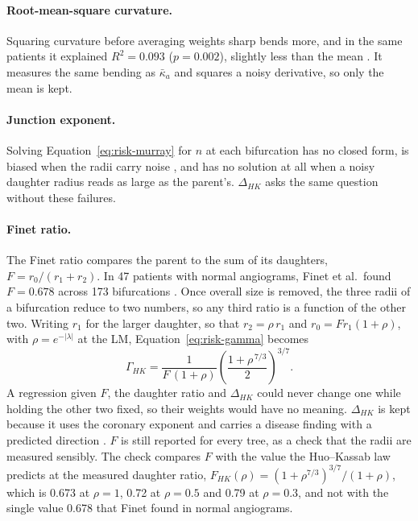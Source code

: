 \paragraph{Root-mean-square curvature.}
Squaring curvature before averaging weights sharp bends more, and in the same patients it explained $R^2 = 0.093$ ($p = 0.002$), slightly less than the mean \cite{kashyap2022tortuosity}.
It measures the same bending as $\bar\kappa_a$ and squares a noisy derivative, so only the mean is kept.

\paragraph{Junction exponent.}
Solving Equation~\ref{eq:risk-murray} for $n$ at each bifurcation has no closed form, is biased when the radii carry noise \cite{witt2010optimality}, and has no solution at all when a noisy daughter radius reads as large as the parent's.
$\Delta_{HK}$ asks the same question without these failures.

\paragraph{Finet ratio.}
The Finet ratio compares the parent to the sum of its daughters, $F = r_0/(r_1 + r_2)$.
In 47 patients with normal angiograms, Finet et al.\ found $F = 0.678$ across 173 bifurcations \cite{finet2008fractal}.
Once overall size is removed, the three radii of a bifurcation reduce to two numbers, so any third ratio is a function of the other two.
Writing $r_1$ for the larger daughter, so that $r_2 = \rho\, r_1$ and $r_0 = F r_1 (1 + \rho)$, with $\rho = e^{-\lvert\lambda\rvert}$ at the LM, Equation~\ref{eq:risk-gamma} becomes
\begin{equation}
  \Gamma_{HK} = \frac{1}{F\,(1 + \rho)} \left(\frac{1 + \rho^{\,7/3}}{2}\right)^{3/7}.
  \label{eq:risk-dependence}
\end{equation}
A regression given $F$, the daughter ratio and $\Delta_{HK}$ could never change one while holding the other two fixed, so their weights would have no meaning.
$\Delta_{HK}$ is kept because it uses the coronary exponent and carries a disease finding with a predicted direction \cite{schoenenberger2012murray}.
$F$ is still reported for every tree, as a check that the radii are measured sensibly.
The check compares $F$ with the value the Huo--Kassab law predicts at the measured daughter ratio, $F_{HK}(\rho) = (1 + \rho^{7/3})^{3/7}/(1 + \rho)$, which is 0.673 at $\rho = 1$, 0.72 at $\rho = 0.5$ and 0.79 at $\rho = 0.3$, and not with the single value 0.678 that Finet found in normal angiograms.

